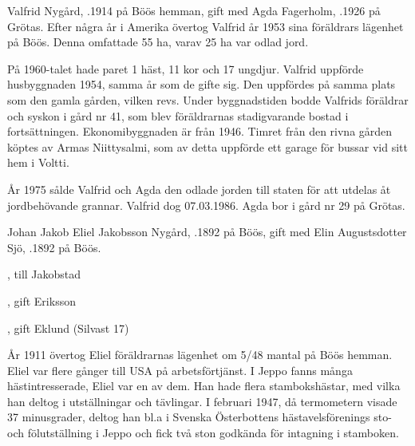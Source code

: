 %
Valfrid Nygård, .1914 på Böös hemman, gift med Agda Fagerholm, .1926 på Grötas. Efter några år i Amerika övertog Valfrid år 1953 sina föräldrars lägenhet på Böös. Denna omfattade 55 ha, varav 25 ha var odlad jord.

På 1960-talet hade paret 1 häst, 11 kor och 17 ungdjur. Valfrid uppförde husbyggnaden 1954, samma år som de gifte sig. Den uppfördes på samma plats som den gamla gården, vilken revs. Under byggnadstiden bodde Valfrids föräldrar och syskon i gård nr 41, som blev föräldrarnas stadigvarande bostad i fortsättningen. Ekonomibyggnaden är från 1946. Timret från den rivna gården köptes av Armas Niittysalmi, som av detta uppförde ett garage för bussar vid sitt hem i Voltti.

År 1975 sålde Valfrid och Agda den odlade jorden till staten för att utdelas åt jordbehövande grannar. Valfrid dog 07.03.1986. Agda bor i gård nr 29 på Grötas.



%



%
Johan Jakob Eliel Jakobsson Nygård, .1892 på Böös, gift med Elin Augustsdotter Sjö, .1892 på Böös.
\begin{jhchildren}
  \item {}
  \item {}
  \item {}
  \item {}, till Jakobstad
  \item {}, gift Eriksson
  \item {}
  \item {}, gift Eklund (Silvast 17)
\end{jhchildren}
År 1911 övertog Eliel föräldrarnas lägenhet om 5/48 mantal på Böös hemman. Eliel var flere gånger till USA på arbetsförtjänst. I Jeppo fanns många hästintresserade, Eliel var en av dem. Han hade flera stambokshästar, med vilka han deltog i utställningar och tävlingar. I februari 1947, då termometern visade 37 minusgrader, deltog han bl.a i Svenska Österbottens hästavelsförenings sto- och fölutställning i Jeppo och fick två ston godkända för intagning  i stamboken.

